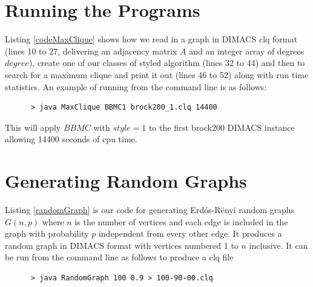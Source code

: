 \documentclass{l4proj}
\begin{document}
\begin{appendices}

\chapter{Running the Programs}
\label{sec:maxCliqueCode}
Listing \ref{codeMaxClique} shows how we read in a graph in DIMACS clq format
(lines 10 to 27, delivering an adjacency matrix $A$ and an integer array of degrees $degree$),
create one of our classes of styled algorithm (lines 32 to 44) and then to search for a maximum clique and
print it out (lines 46 to 52) along with run time statistics. An example of running from the command line is as follows:
\begin{verbatim}
      > java MaxClique BBMC1 brock200_1.clq 14400
\end{verbatim}
This will apply $BBMC$ with $style = 1$ to the first brock200 DIMACS instance allowing 14400 seconds of cpu time.

\begin{figure}

\end{figure}

\chapter{Generating Random Graphs}
\label{sec:randomGraph}
Listing \ref{randomGraph} is our code for generating Erd\'{o}s-R\"{e}nyi random graphs $G(n,p)$ where $n$ is the number of vertices and
each edge is included in the graph with probability $p$ independent from every other edge. It produces
a random graph in DIMACS format with vertices numbered 1 to $n$ inclusive. It can be run from the command line as follows to produce 
a clq file
\begin{verbatim}
      > java RandomGraph 100 0.9 > 100-90-00.clq
\end{verbatim}
\bigskip


\end{appendices}

\end{document}
